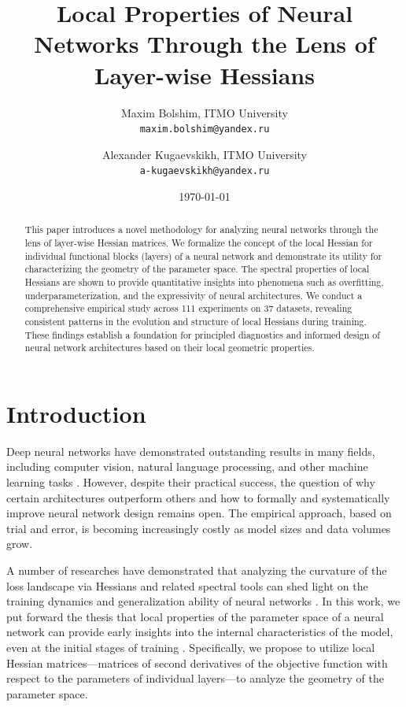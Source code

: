 \documentclass[a4paper,12pt]{article}
\title{Local Properties of Neural Networks Through the Lens of Layer-wise Hessians}
\author{Maxim Bolshim, ITMO University \\ \texttt{maxim.bolshim@yandex.ru}
        \and
        Alexander Kugaevskikh, ITMO University \\ \texttt{a-kugaevskikh@yandex.ru}
}
\date{\today}
\begin{document}
\sloppy
\maketitle
\begin{abstract}
  This paper introduces a novel methodology for analyzing neural networks through the lens of layer-wise
  Hessian matrices. We formalize the concept of the local Hessian for individual functional blocks
  (layers) of a neural network and demonstrate its utility for characterizing the geometry of the parameter
  space. The spectral properties of local Hessians are shown to provide quantitative insights into phenomena
  such as overfitting, underparameterization, and the expressivity of neural architectures. We conduct a
  comprehensive empirical study across 111 experiments on 37 datasets, revealing consistent patterns in the
  evolution and structure of local Hessians during training. These findings establish a foundation for
  principled diagnostics and informed design of neural network architectures based on their local geometric properties.
\end{abstract}

\section{Introduction}

Deep neural networks have demonstrated outstanding results in many fields, including computer vision, natural
language processing, and other machine learning tasks \cite{lecun2015deep, goodfellow2016deep}. However,
despite their practical success, the question of why certain architectures outperform others and how to
formally and systematically improve neural network design remains open. The empirical approach, based on
trial and error, is becoming increasingly costly as model sizes and data volumes grow.

A number of researches have demonstrated that analyzing the curvature of the loss landscape via Hessians and
related spectral tools can shed light on the training dynamics and generalization ability of neural networks
\cite{sagun2017empirical, maheswaranathan2019universality, lee2019wide, arora2019finegrained}. In this work,
we put forward the thesis that local properties of the parameter space of a neural network can provide early
insights into the internal characteristics of the model, even at the initial stages of training
\cite{poole2016transient}. Specifically, we propose to utilize local Hessian matrices—matrices of second
derivatives of the objective function with respect to the parameters of individual layers—to analyze the
geometry of the parameter space.
\end{document}
